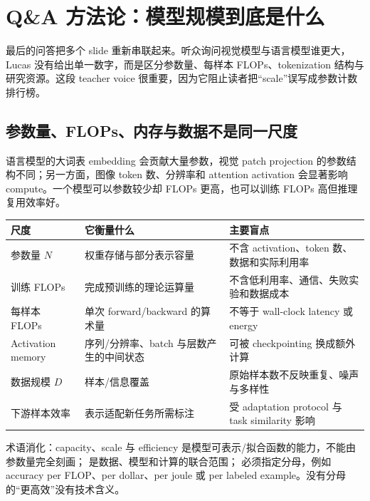 \section{Q\&A 方法论：模型规模到底是什么}

最后的问答把多个 slide 重新串联起来。听众询问视觉模型与语言模型谁更大，Lucas 没有给出单一数字，而是区分参数量、每样本 FLOPs、tokenization 结构与研究资源。这段 teacher voice 很重要，因为它阻止读者把“scale”误写成参数计数排行榜。

\subsection{参数量、FLOPs、内存与数据不是同一尺度}

语言模型的大词表 embedding 会贡献大量参数，视觉 patch projection 的参数结构不同；另一方面，图像 token 数、分辨率和 attention activation 会显著影响 compute。一个模型可以参数较少却 FLOPs 更高，也可以训练 FLOPs 高但推理复用效率好。

\begin{longtable}{L{0.19\textwidth}L{0.31\textwidth}L{0.40\textwidth}}
\toprule
尺度 & 它衡量什么 & 主要盲点 \\
\midrule
参数量 $N$ & 权重存储与部分表示容量 & 不含 activation、token 数、数据和实际利用率 \\
训练 FLOPs & 完成预训练的理论运算量 & 不含低利用率、通信、失败实验和数据成本 \\
每样本 FLOPs & 单次 forward/backward 的算术量 & 不等于 wall-clock latency 或 energy \\
Activation memory & 序列/分辨率、batch 与层数产生的中间状态 & 可被 checkpointing 换成额外计算 \\
数据规模 $D$ & 样本/信息覆盖 & 原始样本数不反映重复、噪声与多样性 \\
下游样本效率 & 表示适配新任务所需标注 & 受 adaptation protocol 与 task similarity 影响 \\
\bottomrule
\end{longtable}

\begin{knowledgebox}{术语消化：capacity、scale 与 efficiency}
 是模型可表示/拟合函数的能力，不能由参数量完全刻画； 是数据、模型和计算的联合范围； 必须指定分母，例如 accuracy per FLOP、per dollar、per joule 或 per labeled example。没有分母的“更高效”没有技术含义。
\end{knowledgebox}


